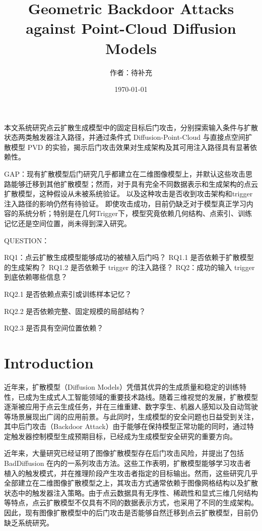 \documentclass[UTF8,a4paper,11pt]{ctexart}
\title{Geometric Backdoor Attacks against Point-Cloud Diffusion Models}
\author{作者：待补充}
\date{\today}
\begin{document}
\maketitle
\tableofcontents
\newpage
本文系统研究点云扩散生成模型中的固定目标后门攻击，分别探索输入条件与扩散状态两类触发器注入路径，并通过条件式 Diffusion-Point-Cloud 与直接点空间扩散模型 PVD 的实验，揭示后门攻击效果对生成架构及其可用注入路径具有显著依赖性。


GAP：现有扩散模型后门研究几乎都建立在二维图像模型上，并默认这些攻击思路能够迁移到其他扩散模型；然而，对于具有完全不同数据表示和生成架构的点云扩散模型，这种假设从未被系统验证。
以及这种攻击是否收到攻击架构和trigger注入路径的影响仍然有待验证。
即使攻击成功，目前仍缺乏对于模型真正学习内容的系统分析；特别是在几何Trigger下，模型究竟依赖几何结构、点索引、训练记忆还是空间位置，尚未得到深入研究。


QUESTION：

RQ1：点云扩散生成模型能够成功的被植入后门吗？
  RQ1.1 是否依赖于扩散模型的生成架构？
  RQ1.2 是否依赖于 trigger 的注入路径？
  RQ2：成功的输入 trigger 到底依赖哪些信息？

RQ2.1 是否依赖点索引或训练样本记忆？

RQ2.2 是否依赖完整、固定规模的局部结构？

RQ2.3 是否具有空间位置依赖？
\section{Introduction}



近年来，扩散模型（Diffusion Models）凭借其优异的生成质量和稳定的训练特性，已成为生成式人工智能领域的重要技术路线。随着三维视觉的发展，扩散模型逐渐被应用于点云生成任务，并在三维重建、数字孪生、机器人感知以及自动驾驶等场景展现出广阔的应用前景。与此同时，生成模型的安全问题也日益受到关注，其中后门攻击（Backdoor Attack）由于能够在保持模型正常功能的同时，通过特定触发器控制模型生成预期目标，已经成为生成模型安全研究的重要方向。

近年来，大量研究已经证明了图像扩散模型存在后门攻击风险，并提出了包括 BadDiffusion 在内的一系列攻击方法。这些工作表明，扩散模型能够学习攻击者植入的触发模式，并在推理阶段产生攻击者指定的目标输出。然而，这些研究几乎全部建立在二维图像扩散模型之上，其攻击方式通常依赖于图像网格结构以及扩散状态中的触发器注入策略。由于点云数据具有无序性、稀疏性和显式三维几何结构等特点，点云扩散模型不仅具有不同的数据表示方式，也采用了不同的生成架构。因此，现有图像扩散模型中的后门攻击是否能够自然迁移到点云扩散模型，目前仍缺乏系统研究。
\end{document}
